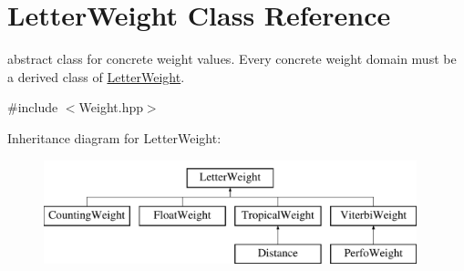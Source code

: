 \hypertarget{classLetterWeight}{}\section{Letter\+Weight Class Reference}
\label{classLetterWeight}


abstract class for concrete weight values. Every concrete weight domain must be a derived class of \mbox{\hyperlink{classLetterWeight}{Letter\+Weight}}.  




{\ttfamily \#include $<$Weight.\+hpp$>$}

Inheritance diagram for Letter\+Weight\+:\begin{figure}[H]
\begin{center}
\leavevmode
\includegraphics[height=3.000000cm]{classLetterWeight}
\end{center}
\end{figure}
